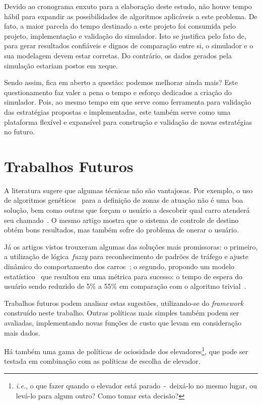 Devido ao cronograma enxuto para a elaboração deste estudo, não houve tempo
hábil para expandir as possibilidades de algoritmos aplicáveis a este problema.
De fato, a maior parcela do tempo destinado a este projeto foi consumida pelo
projeto, implementação e validação do simulador. Isto se justifica pelo fato de,
para gerar resultados confiáveis e dignos de comparação entre si, o simulador e
o sua modelagem devem estar corretas. Do contrário, os dados gerados pela
simulação estariam postos em xeque.

Sendo assim, fica em aberto a questão: podemos melhorar ainda mais? Este
questionamento faz valer a pena o tempo e esforço dedicados a criação do
simulador. Pois, ao mesmo tempo em que serve como ferramenta para validação das
estratégias propostas e implementadas, este também serve como uma plataforma
flexível e expansível para construção e validação de novas estratégias no
futuro.

\section{Trabalhos Futuros}

A literatura sugere que algumas técnicas não são vantajosas. Por exemplo, o uso
de algoritmos genéticos~\cite{KOEHLEROTTIGER02} para a definição de zonas de
atuação não é uma boa solução, bem como outras que forçam o usuário a descobrir
qual carro atenderá seu chamado~\cite{KOEHLEROTTIGER02}. O mesmo artigo mostra que o sistema de controle
de destino~\cite{KOEHLEROTTIGER02} obtém bons resultados, mas também sofre do
problema de onerar o usuário.

Já os artigos vistos trouxeram algumas das soluções mais promissoras: o
primeiro, a utilização de lógica~\textit{fuzzy} para reconhecimento de padrões
de tráfego e ajuste dinâmico do comportamento dos carros~\cite{marja97}; o
segundo, propondo um modelo estatístico~\cite{DBLP:journals/corr/abs-1212-2499}
que resultou em uma métrica para sucesso: o tempo de espera do usuário sendo
reduzido de 5\% a 55\% em comparação com o algoritmo
trivial~\cite{DBLP:journals/corr/abs-1212-2499}.

Trabalhos futuros podem analisar estas sugestões, utilizando-se do
\textit{framework} construído neste trabalho. Outras políticas mais simples
também podem ser avaliadas, implementando novas funções de custo que levam em
consideração mais dados.

Há também uma gama de políticas de ociosidade dos
elevadores\footnote{\textit{i.e.}, o que fazer quando o elevador está
  parado~-~deixá-lo no mesmo lugar, ou levá-lo para algum outro? Como tomar esta
decisão?}, que pode ser testada em combinação com as políticas de escolha de elevador.

